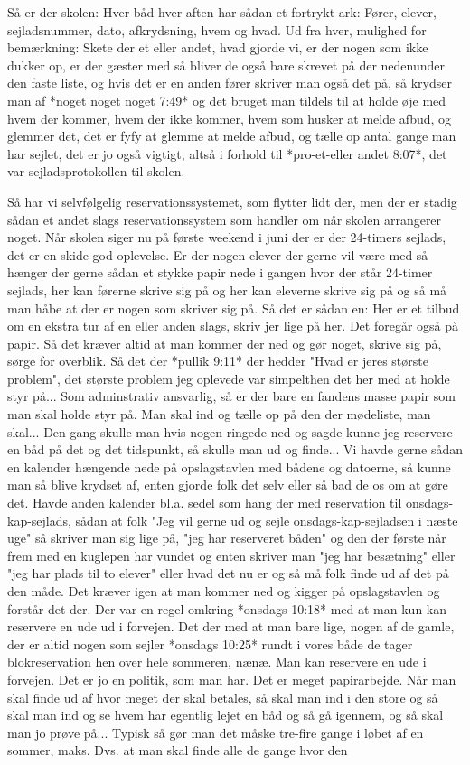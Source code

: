 Så er der skolen: Hver båd hver aften har sådan et fortrykt ark: Fører, elever, sejladsnummer, dato, afkrydsning, hvem og hvad. Ud fra hver, mulighed for bemærkning: Skete der et eller andet, hvad gjorde vi, er der nogen som ikke dukker op, er der gæster med så bliver de også bare skrevet på der nedenunder den faste liste, og hvis det er en anden fører skriver man også det på, så krydser man af *noget noget noget 7:49* og det bruget man tildels til at holde øje med hvem der kommer, hvem der ikke kommer, hvem som husker at melde afbud, og glemmer det, det er fyfy at glemme at melde afbud, og tælle op antal gange man har sejlet, det er jo også vigtigt, altså i forhold til *pro-et-eller andet 8:07*, det var sejladsprotokollen til skolen. 

Så har vi selvfølgelig reservationssystemet, som flytter lidt der, men der er stadig sådan et andet slags reservationssystem som handler om når skolen arrangerer noget. Når skolen siger nu på første weekend i juni der er der 24-timers sejlads, det er en skide god oplevelse. Er der nogen elever der gerne vil være med så hænger der gerne sådan et stykke papir nede i gangen hvor der står 24-timer sejlads, her kan førerne skrive sig på og her kan eleverne skrive sig på og så må man håbe at der er nogen som skriver sig på. Så det er sådan en: Her er et tilbud om en ekstra tur af en eller anden slags, skriv jer lige på her. Det foregår også på papir. Så det kræver altid at man kommer der ned og gør noget, skrive sig på, sørge for overblik. Så det der *pullik 9:11* der hedder "Hvad er jeres største problem", det største problem jeg oplevede var simpelthen det her med at holde styr på... Som adminstrativ ansvarlig, så er der bare en fandens masse papir som man skal holde styr på. Man skal ind og tælle op på den der mødeliste, man skal... Den gang skulle man hvis nogen ringede ned og sagde kunne jeg reservere en båd på det og det tidspunkt, så skulle man ud og finde... Vi havde gerne sådan en kalender hængende nede på opslagstavlen med bådene og datoerne, så kunne man så blive krydset af, enten gjorde folk det selv eller så bad de os om at gøre det. Havde anden kalender bl.a. sedel som hang der med reservation til onsdags-kap-sejlads, sådan at folk "Jeg vil gerne ud og sejle onsdags-kap-sejladsen i næste uge" så skriver man sig lige på, "jeg har reserveret båden" og den der første når frem med en kuglepen har vundet og enten skriver man "jeg har besætning" eller "jeg har plads til to elever" eller hvad det nu er og så må folk finde ud af det på den måde. Det kræver igen at man kommer ned og kigger på opslagstavlen og forstår det der. Der var en regel omkring *onsdags 10:18* med at man kun kan reservere en ude ud i forvejen. Det der med at man bare lige, nogen af de gamle, der er altid nogen som sejler *onsdags 10:25* rundt i vores både de tager blokreservation hen over hele sommeren, nænæ. Man kan reservere en ude i forvejen. Det er jo en politik, som man har. Det er meget papirarbejde. Når man skal finde ud af hvor meget der skal betales, så skal man ind i den store og så skal man ind og se hvem har egentlig lejet en båd og så gå igennem, og så skal man jo prøve på... Typisk så gør man det måske tre-fire gange i løbet af en sommer, maks. Dvs. at man skal finde alle de gange hvor den 